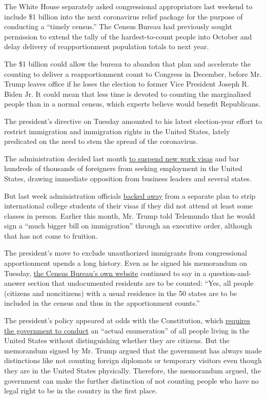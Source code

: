 The White House separately asked congressional appropriators last
weekend to include \$1 billion into the next coronavirus relief package
for the purpose of conducting a ``timely census.'' The Census Bureau had
previously sought permission to extend the tally of the hardest-to-count
people into October and delay delivery of reapportionment population
totals to next year.

The \$1 billion could allow the bureau to abandon that plan and
accelerate the counting to deliver a reapportionment count to Congress
in December, before Mr. Trump leaves office if he loses the election to
former Vice President Joseph R. Biden Jr. It could mean that less time
is devoted to counting the marginalized people than in a normal census,
which experts believe would benefit Republicans.

The president's directive on Tuesday amounted to his latest
election-year effort to restrict immigration and immigration rights in
the United States, lately predicated on the need to stem the spread of
the coronavirus.

The administration decided last month
\href{https://www.nytimes3xbfgragh.onion/2020/06/22/us/politics/trump-h1b-work-visas.html}{to
suspend new work visas} and bar hundreds of thousands of foreigners from
seeking employment in the United States, drawing immediate opposition
from business leaders and several states.

But last week administration officials
\href{https://www.nytimes3xbfgragh.onion/2020/06/22/us/politics/trump-h1b-work-visas.html}{backed
away} from a separate plan to strip international college students of
their visas if they did not attend at least some classes in person.
Earlier this month, Mr. Trump told Telemundo that he would sign a ``much
bigger bill on immigration'' through an executive order, although that
has not come to fruition.

The president's move to exclude unauthorized immigrants from
congressional apportionment upends a long history. Even as he signed his
memorandum on Tuesday,
\href{https://www.census.gov/population/apportionment/about/faq.html\#Q16}{the
Census Bureau's own website} continued to say in a question-and-answer
section that undocumented residents are to be counted: ``Yes, all people
(citizens and noncitizens) with a usual residence in the 50 states are
to be included in the census and thus in the apportionment counts.''

The president's policy appeared at odds with the Constitution, which
\href{https://www.census.gov/programs-surveys/decennial-census/about/census-constitution.html}{requires
the government to conduct} an ``actual enumeration'' of all people
living in the United States without distinguishing whether they are
citizens. But the memorandum signed by Mr. Trump argued that the
government has always made distinctions like not counting foreign
diplomats or temporary visitors even though they are in the United
States physically. Therefore, the memorandum argued, the government can
make the further distinction of not counting people who have no legal
right to be in the country in the first place.

